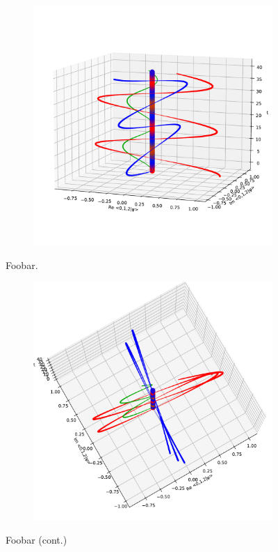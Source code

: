 \begin{figure}[hb!]
  \centering
  \begin{subfigure}{\textwidth}
      \includegraphics[width=\textwidth]{img/3ldetect/hermitianSpaceTime_side.pdf}
  \end{subfigure}
  \caption{Foobar.}
\end{figure}%
\begin{figure}[ht]\ContinuedFloat
  \centering
  \begin{subfigure}{\textwidth}
      \includegraphics[width=\textwidth]{img/3ldetect/hermitianSpaceTime_top.pdf}
  \end{subfigure}
  \caption{Foobar (cont.)}
\end{figure}


